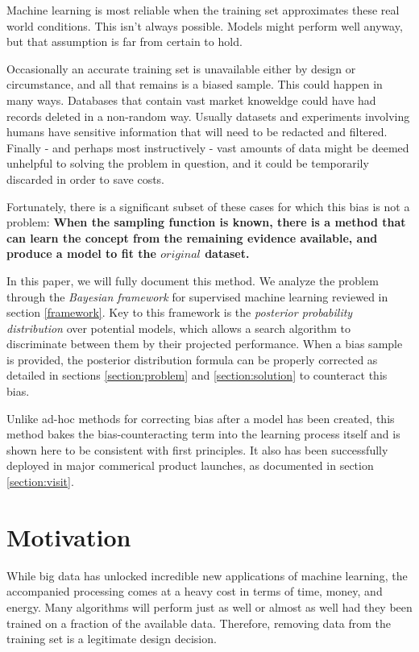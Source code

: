\documentclass[twoside]{article}
\begin{document}
Machine learning is most reliable when the training set approximates these real world conditions. This isn't always possible. Models might perform well anyway, but that assumption is far from certain to hold.

Occasionally an accurate training set is unavailable either by design or circumstance, and all that remains is a biased sample. This could happen in many ways. Databases that contain vast market knoweldge could have had records deleted in a non-random way. Usually datasets and experiments involving humans have sensitive information that will need to be redacted and filtered. Finally - and perhaps most instructively - vast amounts of data might be deemed unhelpful to solving the problem in question, and it could be temporarily discarded in order to save costs.

Fortunately, there is a significant subset of these cases for which this bias is not a problem: \textbf{When the sampling function is known, there is a method that can learn the concept from the remaining evidence available, and produce a model to fit the \(original\) dataset.}

In this paper, we will fully document this method. We analyze the problem through the \textit{Bayesian framework} for supervised machine learning reviewed in section \ref{framework}. Key to this framework is the \textit{posterior probability distribution} over potential models, which allows a search algorithm to discriminate between them by their projected performance. When a bias sample is provided, the posterior distribution formula can be properly corrected as detailed in sections \ref{section:problem} and \ref{section:solution} to counteract this bias.

Unlike ad-hoc methods for correcting bias after a model has been created, this method bakes the bias-counteracting term into the learning process itself and is shown here to be consistent with first principles. It also has been successfully deployed in major commerical product launches, as documented in section \ref{section:visit}.

\section{Motivation}

While big data has unlocked incredible new applications of machine learning, the accompanied processing comes at a heavy cost in terms of time, money, and energy. Many algorithms will perform just as well or almost as well had they been trained on a fraction of the available data. Therefore, removing data from the training set is a legitimate design decision.
\end{document}
